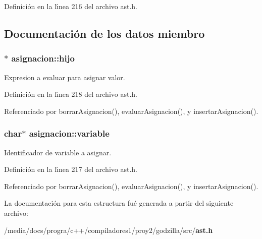 Definici\'{o}n en la l\'{\i}nea 216 del archivo ast.h.

\subsection{Documentaci\'{o}n de los datos miembro}
\subsubsection{$\ast$ {\bf asignacion::hijo}}\label{structasignacion_o1}


Expresion a evaluar para asignar valor. 



Definici\'{o}n en la l\'{\i}nea 218 del archivo ast.h.

Referenciado por borrar\-Asignacion(), evaluar\-Asignacion(), y insertar\-Asignacion().
\subsubsection{\setlength{\rightskip}{0pt plus 5cm}char$\ast$ {\bf asignacion::variable}}\label{structasignacion_o0}


Identificador de variable a asignar. 



Definici\'{o}n en la l\'{\i}nea 217 del archivo ast.h.

Referenciado por borrar\-Asignacion(), evaluar\-Asignacion(), y insertar\-Asignacion().

La documentaci\'{o}n para esta estructura fu\'{e} generada a partir del siguiente archivo:\begin{CompactItemize}
\item 
/media/docs/progra/c++/compiladores1/proy2/godzilla/src/{\bf ast.h}\end{CompactItemize}

